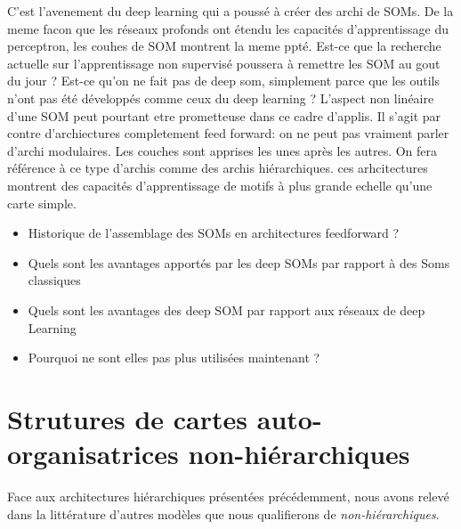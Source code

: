 \documentclass[../main]{subfiles}
\begin{document}
C'est l'avenement du deep learning qui a poussé à créer des archi de SOMs. De la meme facon que les réseaux profonds ont étendu les capacités d'apprentissage du perceptron, les couhes de SOM montrent la meme ppté.
Est-ce que la recherche actuelle sur l'apprentissage non supervisé poussera à remettre les SOM au gout du jour ? Est-ce qu'on ne fait pas de deep som, simplement parce que les outils n'ont pas été développés comme ceux du deep learning ? L'aspect non linéaire d'une SOM peut pourtant etre prometteuse dans ce cadre d'applis.
Il s'agit par contre d'archiectures completement feed forward: on ne peut pas vraiment parler d'archi modulaires. Les couches sont apprises les unes après les autres.
On fera référence à ce type d'archis comme des archis hiérarchiques.
ces arhcitectures montrent des capacités d'apprentissage de motifs à plus grande echelle qu'une carte simple.

\begin{itemize}
    \item Historique de l'assemblage des SOMs en architectures feedforward ? 
    \item Quels sont les avantages apportés par les deep SOMs par rapport à des Soms classiques
    \item Quels sont les avantages des deep SOM par rapport aux réseaux de deep Learning 
    \item Pourquoi ne sont elles pas plus utilisées maintenant ?
\end{itemize}

\section{Strutures de cartes auto-organisatrices non-hiérarchiques}

Face aux architectures hiérarchiques présentées précédemment, nous avons relevé dans la littérature d'autres modèles que nous qualifierons de \emph{non-hiérarchiques}. 
\end{document}
